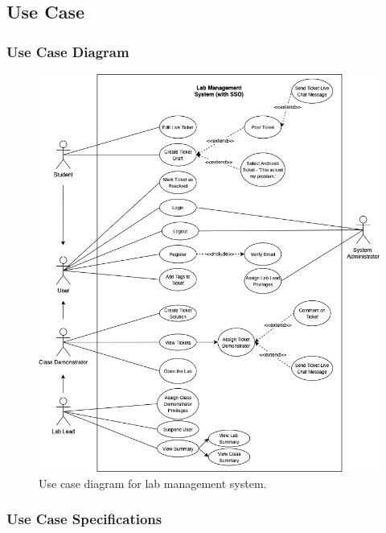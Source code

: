 \documentclass[a4paper,11pt]{article}
\begin{document}
\newpage
\subsection{Use Case}

\subsubsection{Use Case Diagram}

\begin{figure}[H]
    \centering
    \includegraphics[width=\textwidth]{useCase.png}
    \caption{Use case diagram for lab management system.}
    \label{fig:useCase}
\end{figure}

\subsubsection{Use Case Specifications}
\end{document}
